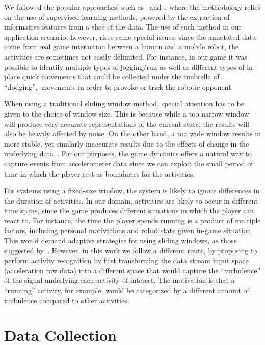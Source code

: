 We followed the popular approaches, such as~\cite{ravi_activity_2005} and~\cite{bao_activity_2004}, where the methodology relies on the use of supervised learning methods, powered by the extraction of informative features from a slice of the data. The use of such method in our application scenario, however, rises same special issues: since the annotated data come from real game interaction between a human and a mobile robot, the activities are sometimes not easily delimited. For instance, in our game it was possible to identify multiple types of jogging/run as well as different types of in-place quick movements that could be collected under the umbrella of ``dodging'',~\ie movements in order to provoke or trick the robotic opponent. 

When using a traditional sliding window method, special attention has to be given to the choice of window size. This is because while a too narrow window will produce very accurate representations of the current state, the results will also be heavily affected by noise. On the other hand, a too wide window results in more stable, yet similarly inaccurate results due to the effects of change in the underlying data~\citep{bifet_learning_2007}. For our purposes, the game dynamics offers a natural way to capture events from accelerometer data since we can exploit the small period of time in which the player rest as boundaries for the activities. 

For systems using a fixed-size window, the system is likely to ignore differences in the duration of activities. In our domain, activities are likely to occur in different time spans, since the game produces different situations in which the player can react to. For instance, the time the player spends running is a product of multiple factors, including personal motivations and robot state given in-game situation. This would demand adaptive strategies for using sliding windows, as those suggested by~\cite{noor_adaptive_2016}. However, in this work we follow a different route, by proposing to perform activity recognition by first transforming the data stream input space (acceleration raw data) into a different space that would capture the ``turbulence'' of the signal underlying each activity of interest. The motivation is that a ``running'' activity, for example, would be categorized by a different amount of turbulence compared to other activities.

\section{Data Collection}\label{sec:data_collection}


